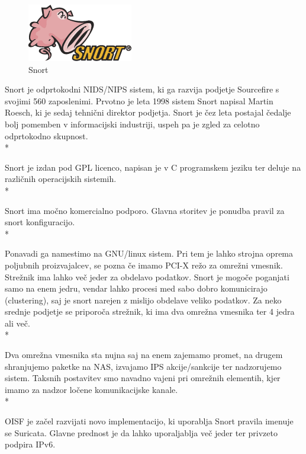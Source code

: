 \documentclass[12pt]{article}
\begin{document}
\begin{figure}[htb]
\begin{center}
\includegraphics[scale=0.8]{Snort_ids_logo.png}
\end{center}
\caption{Snort}
\label{snort_img}
\end{figure}

Snort\cite{snort} je odprtokodni NIDS/NIPS sistem, ki ga razvija podjetje Sourcefire\cite{sourcefire} s svojimi 560 zaposlenimi.
Prvotno je leta 1998 sistem Snort napisal Martin Roesch, ki je sedaj tehnični direktor podjetja. 
Snort je čez leta postajal čedalje bolj pomemben v informacijski industriji, uspeh pa je zgled za celotno odprtokodno skupnost.
\\*

Snort je izdan pod GPL licenco, napisan je v C programskem jeziku ter deluje na različnih operacijskih sistemih.
\\*

Snort ima močno komercialno podporo. Glavna storitev je ponudba pravil za snort konfiguracijo.
\\*

Ponavadi ga namestimo na GNU/linux sistem. Pri tem je lahko strojna oprema poljubnih proizvajalcev, se pozna če imamo PCI-X režo za omrežni vmesnik.
Strežnik ima lahko več jeder za obdelavo podatkov. Snort je mogoče poganjati samo na enem jedru, vendar lahko procesi med sabo dobro komunicirajo (clustering), saj je snort narejen z mislijo obdelave veliko podatkov.
Za neko srednje podjetje se priporoča strežnik, ki ima dva omrežna vmesnika ter 4 jedra ali več.
\\*

Dva omrežna vmesnika sta nujna saj na enem zajemamo promet, na drugem shranjujemo paketke na NAS, izvajamo IPS akcije/sankcije ter nadzorujemo sistem. Taksnih postavitev smo navadno vajeni pri omrežnih elementih, kjer imamo za nadzor ločene komunikacijske kanale.
\\*

OISF\cite{oisf} je začel razvijati novo implementacijo, ki uporablja Snort pravila imenuje se Suricata.
Glavne prednost je da lahko uporaljablja več jeder ter privzeto podpira IPv6.

\end{document}
